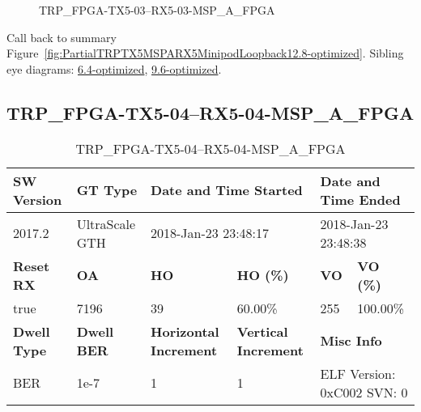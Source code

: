 \begin{figure}[h]
\caption{TRP\_FPGA-TX5-03--RX5-03-MSP\_A\_FPGA} \label{fig:TRPFPGATX503RX503MSPAFPGA12.8-optimized}
\end{figure}

Call back to summary Figure~\ref{fig:PartialTRPTX5MSPARX5MinipodLoopback12.8-optimized}.
Sibling eye diagrams: \hyperref[sec:TRPFPGATX503RX503MSPAFPGA6.4-optimized]{6.4-optimized}, \hyperref[sec:TRPFPGATX503RX503MSPAFPGA9.6-optimized]{9.6-optimized}.

\clearpage
\newpage


\subsection{TRP\_FPGA-TX5-04--RX5-04-MSP\_A\_FPGA}\label{sec:TRPFPGATX504RX504MSPAFPGA12.8-optimized}

\begin{table}[h]
\centering
\caption{TRP\_FPGA-TX5-04--RX5-04-MSP\_A\_FPGA}
\label{tab:TRPFPGATX504RX504MSPAFPGA12.8-optimized}
\begin{tabular}{@{}|l|l|l|l|l|l|@{}}
\toprule
\textbf{SW Version}                & \textbf{GT Type}   & \multicolumn{2}{l|}{\textbf{Date and Time Started}}            & \multicolumn{2}{l|}{\textbf{Date and Time Ended}}        \\ \midrule
2017.2                       & UltraScale GTH          & \multicolumn{2}{l|}{2018-Jan-23 23:48:17}                   & \multicolumn{2}{l|}{2018-Jan-23 23:48:38}               \\ \midrule
\textbf{Reset RX}                  & \textbf{OA} & \textbf{HO}   & \textbf{HO (\%)} & \textbf{VO} & \textbf{VO (\%)} \\ \midrule
true & 7196        & 39          & 60.00\%        & 255        & 100.00\%       \\ \midrule
\textbf{Dwell Type}                & \textbf{Dwell BER} & \textbf{Horizontal Increment} & \textbf{Vertical Increment}    & \multicolumn{2}{l|}{\textbf{Misc Info}}                  \\ \midrule
BER                            & 1e-7        & 1        & 1           & \multicolumn{2}{l|}{ELF Version: 0xC002 SVN: 0}                         \\ \bottomrule
\end{tabular}
\end{table}

